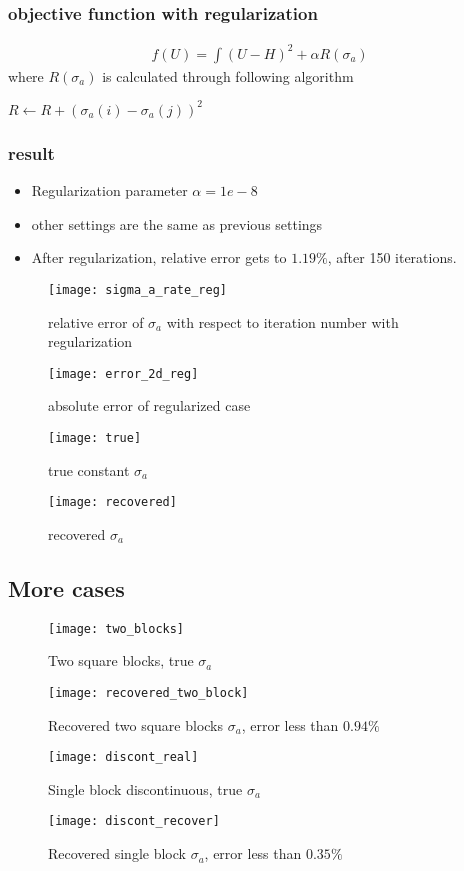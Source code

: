 \documentclass[12pt,a4paper]{report}
\begin{document}
\subsubsection{objective function with regularization}
\begin{eqnarray}
f(U) = \int (U- H)^2 + \alpha R (\sigma_a)
\end{eqnarray}
where $R(\sigma_a)$ is calculated through following algorithm

\begin{center}
\begin{algorithmic}
	\State $R \gets R + (\sigma_a(i) - \sigma_a(j))^2$
	\EndFor
	\EndFor
\end{algorithmic}
\end{center}

\subsubsection{result}
\begin{itemize}
	\item Regularization parameter $\alpha = 1e-8$
	\item other settings are the same as previous settings
\end{itemize}

\begin{itemize}
	\item After regularization, relative error gets to $1.19\%$, after 150 iterations.
\end{itemize}
\begin{figure}[htb!]
	\texttt{[image: sigma\_a\_rate\_reg]}
	\caption{relative error of $\sigma_a$ with respect to iteration number with regularization}
\end{figure}
\begin{figure}[htb!]
	\texttt{[image: error\_2d\_reg]}
	\caption{absolute error of regularized case}
\end{figure}

\begin{figure}[htb!]
	\texttt{[image: true]}
	\caption{true constant $\sigma_a$}
\end{figure}

\begin{figure}[htb!]
	\texttt{[image: recovered]}
	\caption{recovered $\sigma_a$}
	\end{figure}
		
\subsection{More cases}
\begin{figure}[htb!]
	\texttt{[image: two\_blocks]}
	\caption{Two square blocks, true $\sigma_a$}
\end{figure}
\begin{figure}[htb!]
	\texttt{[image: recovered\_two\_block]}
	\caption{Recovered two square blocks $\sigma_a$, error less than $0.94\%$}
\end{figure}

\begin{figure}[htb!]
	\texttt{[image: discont\_real]}
	\caption{Single block discontinuous, true $\sigma_a$}
\end{figure}
\begin{figure}[htb!]
	\texttt{[image: discont\_recover]}
	\caption{Recovered single block $\sigma_a$, error less than $0.35\%$}
\end{figure}
\end{document}
